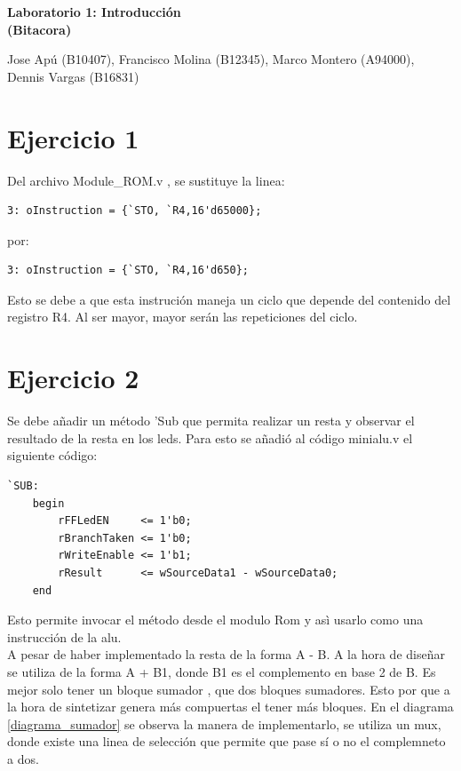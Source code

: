 \documentclass[10pt]{article}
\begin{document}
\begin{huge}
\begin{center}
\textbf{Laboratorio 1: Introducción\\ (Bitacora)}
\end{center}
\end{huge}

\begin{Large}
\begin{center}
Jose Apú (B10407), Francisco Molina (B12345), Marco Montero (A94000), Dennis Vargas (B16831)
\end{center}
\end{Large}

\section*{Ejercicio 1}
Del archivo Module\_ROM.v , se sustituye la linea:
\begin{lstlisting}
3: oInstruction = {`STO, `R4,16'd65000};
\end{lstlisting}
por:
\begin{lstlisting}
3: oInstruction = {`STO, `R4,16'd650};
\end{lstlisting}

Esto se debe a que esta instrución maneja un ciclo que depende del contenido del registro R4. Al ser mayor, mayor serán las repeticiones del ciclo.

\section*{Ejercicio 2}
Se debe añadir un método 'Sub que permita realizar un resta y observar el resultado de la resta en los leds.
Para esto se añadió al código minialu.v el siguiente código:
\begin{lstlisting}
`SUB:
	begin
		rFFLedEN     <= 1'b0;
		rBranchTaken <= 1'b0;
		rWriteEnable <= 1'b1;
		rResult      <= wSourceData1 - wSourceData0;
	end
\end{lstlisting}
Esto permite invocar el método desde el modulo Rom y asì usarlo como una instrucción de la alu.\\

A pesar de haber implementado la resta de la forma A - B. A la hora de diseñar se utiliza de la forma A + B1, donde B1 es el complemento en base 2 de B. Es mejor solo tener un bloque sumador , que dos bloques sumadores. Esto por que a la hora de sintetizar genera más compuertas el tener más bloques. En el diagrama \ref{diagrama_sumador} se observa la manera de implementarlo, se utiliza un mux, donde existe una linea de selección que permite que pase sí o no el complemneto a dos.\\ 
\end{document}

